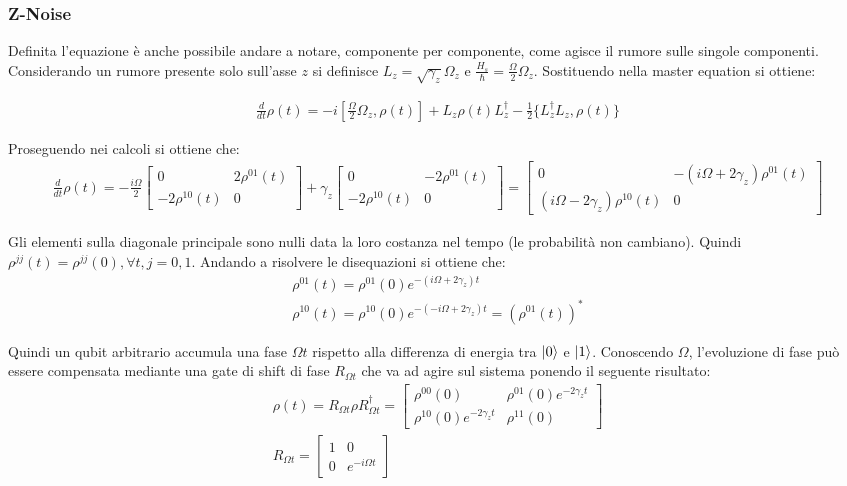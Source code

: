 \subsubsection{Z-Noise}
Definita l'equazione è anche possibile andare a notare, componente per componente, come agisce il rumore sulle singole componenti. Considerando un rumore presente solo sull'asse \(z\) si definisce \(L_z = \sqrt{\gamma_z}\Omega_z\) e \(\frac{H_s}{\hbar} = \frac{\Omega}{2}\Omega_z\). Sostituendo nella master equation si ottiene:

\begin{gather*}
    \frac{d}{dt}\rho(t) = -i\left[\frac{\Omega}{2}\Omega_z, \rho(t)\right] + L_z \rho(t) L_z^\dagger - \frac{1}{2}\{L_z^\dagger L_z, \rho(t)\}
\end{gather*}

Proseguendo nei calcoli si ottiene che:
\begin{gather*}
\frac{d}{dt}\rho(t) = -\frac{i \Omega}{2}
\left[\begin{smallmatrix}
0 & 2 \rho^{01}(t)\\
-2\rho^{10}(t) & 0
\end{smallmatrix}\right] +
\gamma_z
\left[\begin{smallmatrix}
0 & -2 \rho^{01}(t)\\
-2\rho^{10}(t) & 0
\end{smallmatrix}\right] = 
\left[\begin{smallmatrix}
0 & -(i\Omega + 2 \gamma_z)\rho^{01}(t)\\
(i\Omega-2 \gamma_z)\rho^{10}(t) & 0
\end{smallmatrix}\right]
\end{gather*}

Gli elementi sulla diagonale principale sono nulli data la loro costanza nel tempo (le probabilità non cambiano). Quindi \(\rho^{jj}(t) = \rho^{jj}(0), \forall t, j=0,1\). Andando a risolvere le disequazioni si ottiene che:
\begin{gather*}
    \rho^{01}(t) = \rho^{01}(0)e^{-(i\Omega + 2\gamma_z)t}\\
    \rho^{10}(t) = \rho^{10}(0)e^{-(-i\Omega + 2 \gamma_z)t}= (\rho^{01}(t))^*
\end{gather*}

Quindi un qubit arbitrario accumula una fase \(\Omega t\) rispetto alla differenza di energia tra \(\ket{0}\) e \(\ket{1}\). Conoscendo \(\Omega\), l'evoluzione di fase può essere compensata mediante una gate di shift di fase \(R_{\Omega t}\) che va ad agire sul sistema ponendo il seguente risultato:
\begin{gather*}
    \rho(t) = R_{\Omega t} \rho R_{\Omega t}^\dagger = \left[\begin{smallmatrix}
        \rho^{00}(0) & \rho^{01}(0)e^{-2 \gamma_z t}\\
        \rho^{10}(0)e^{-2 \gamma_z t} & \rho^{11}(0)
    \end{smallmatrix}\right]\\
    R_{\Omega t} = \left[\begin{smallmatrix}
        1 & 0\\
        0 & e^{-i \Omega t}
    \end{smallmatrix}\right]
\end{gather*}

